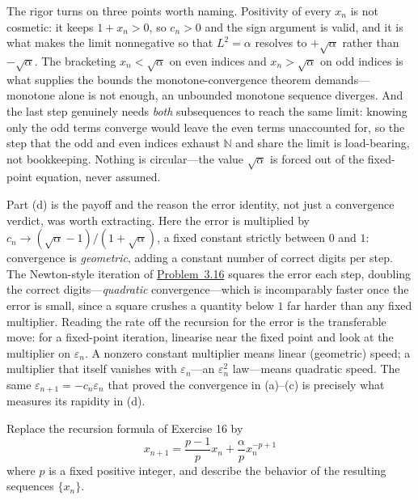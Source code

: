 \documentclass[main.tex]{subfiles}
\begin{document}
\begin{Reflection}
The rigor turns on three points worth naming. Positivity of every $x_{n}$ is not cosmetic: it keeps
$1+x_{n}>0$, so $c_{n}>0$ and the sign argument is valid, and it is what makes the limit nonnegative so
that $L^{2}=\alpha$ resolves to $+\sqrt\alpha$ rather than $-\sqrt\alpha$. The bracketing $x_{n}<\sqrt\alpha$
on even indices and $x_{n}>\sqrt\alpha$ on odd indices is what supplies the bounds the monotone-convergence
theorem demands---monotone alone is not enough, an unbounded monotone sequence diverges. And the last step
genuinely needs \emph{both} subsequences to reach the same limit: knowing only the odd terms converge would
leave the even terms unaccounted for, so the step that the odd and even indices exhaust $\mathbb N$ and
share the limit is load-bearing, not bookkeeping. Nothing is circular---the value $\sqrt\alpha$ is forced
out of the fixed-point equation, never assumed.

Part (d) is the payoff and the reason the error identity, not just a convergence verdict, was worth
extracting. Here the error is multiplied by $c_{n}\to(\sqrt\alpha-1)/(1+\sqrt\alpha)$, a fixed constant
strictly between $0$ and $1$: convergence is \emph{geometric}, adding a constant number of correct digits
per step. The Newton-style iteration of \hyperlink{prob:3.16}{Problem~3.16} squares the error each step,
doubling the correct digits---\emph{quadratic} convergence---which is incomparably faster once the error
is small, since a square crushes
a quantity below $1$ far harder than any fixed multiplier. Reading the rate off the recursion for the error
is the transferable move: for a fixed-point iteration, linearise near the fixed point and look at the
multiplier on $\varepsilon_{n}$. A nonzero constant multiplier means linear (geometric) speed; a multiplier
that itself vanishes with $\varepsilon_{n}$---an $\varepsilon_{n}^{2}$ law---means quadratic speed. The same
$\varepsilon_{n+1}=-c_{n}\varepsilon_{n}$ that proved the convergence in (a)--(c) is precisely what measures
its rapidity in (d).
\end{Reflection}

Replace the recursion formula of Exercise 16 by
\[
x_{n+1} = \frac{p-1}{p} x_{n} + \frac{\alpha}{p} x_{n}^{-p+1}
\]
where $p$ is a fixed positive integer, and describe the behavior of the resulting sequences $\{x_{n}\}$.
\end{document}
